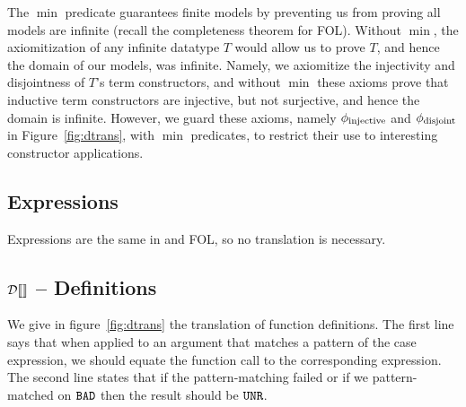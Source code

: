 \documentclass[preprint]{sigplanconf}
\begin{document}
The $\min$ predicate guarantees finite models by preventing us from
proving all models are infinite (recall the completeness theorem for
FOL).  Without $\min$, the axiomitization of any infinite datatype $T$
would allow us to prove $T$, and hence the domain of our models, was
infinite.  Namely, we axiomitize the injectivity and disjointness of
$T$'s term constructors, and without $\min$ these axioms prove that
inductive term constructors are injective, but not surjective, and
hence the domain is infinite.  However, we guard these axioms, namely
$\phi_\text{injective}$ and $\phi_\text{disjoint}$ in Figure~\ref{fig:dtrans}, with
$\min$ predicates, to restrict their use to interesting constructor
applications.

\subsection{Expressions}
Expressions are the same in \hprime and FOL, so no translation is
necessary.

\subsection{$\mathcal{D} \llbracket  \rrbracket$ -- Definitions}
We give in figure~\ref{fig:dtrans} the translation of function
definitions. The first line says that when applied to an argument that
matches a pattern of the case expression, we should equate the
function call to the corresponding expression. The second line states
that if the pattern-matching failed or if we pattern-matched on $\texttt{BAD}$
then the result should be $\texttt{UNR}$.
\end{document}
